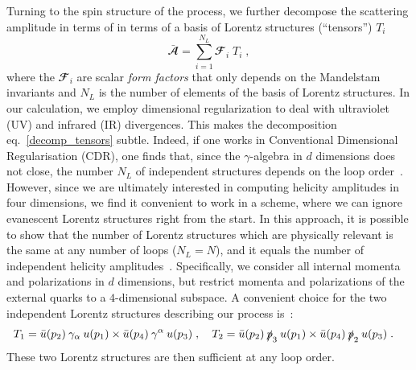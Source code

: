 Turning to the spin structure of the process,  
we further decompose the scattering amplitude in terms of 
in terms of a basis of Lorentz structures (``tensors'') $T_i$
\begin{equation}\label{decomp_tensors}
\bar{\mathbfcal{A}}  = \sum_{i=1}^{N_L}  \mathbfcal{F}_i \;  T_i \;,
\end{equation}
where the $ \mathbfcal{F}_i$ are scalar \textit{form factors} that
only depends on the Mandelstam invariants and
$N_L$ is the number of elements of the basis of Lorentz structures.
In our calculation, we employ dimensional regularization to deal with
ultraviolet (UV) and infrared (IR) divergences. This makes the
decomposition eq.~\eqref{decomp_tensors} subtle.  Indeed,
if one
works in Conventional Dimensional Regularisation (CDR), one finds 
that, since the $\gamma$-algebra in $d$
dimensions does not close,
the number $N_L$ of independent structures depends on the loop
order~\cite{Glover:2004si}.  However, since we are ultimately
interested in computing helicity amplitudes in four dimensions, we
find it convenient to work in a scheme, where we can 
ignore evanescent Lorentz structures right from the start.
In this approach, it is possible to show
that the number of Lorentz structures which are physically
relevant is the same at any number of loops ($N_L = N$), and it
equals the number of independent helicity
amplitudes~\cite{Peraro:2019cjj,Peraro:2020sfm}.
Specifically, we consider all internal momenta and polarizations in $d$ dimensions, but restrict momenta and polarizations of the external quarks
to a $4$-dimensional subspace.
A convenient choice for the two independent Lorentz structures describing our process is~\cite{Peraro:2020sfm}:
\begin{align} \label{tensors}
T_1 &= {\bar u} (p_2)\: \gamma_\alpha \: { u} (p_1) \times {\bar u} (p_4) \: \gamma^\alpha \:{ u}(p_3) \; ,
\quad
T_2 = {\bar u} (p_2)\: \slashed p_3 \: { u} (p_1) \times   {\bar u} (p_4) \: \slashed p_2 \:{ u}(p_3) \;.
\end{align} 
These two Lorentz structures are then sufficient at any loop order.

